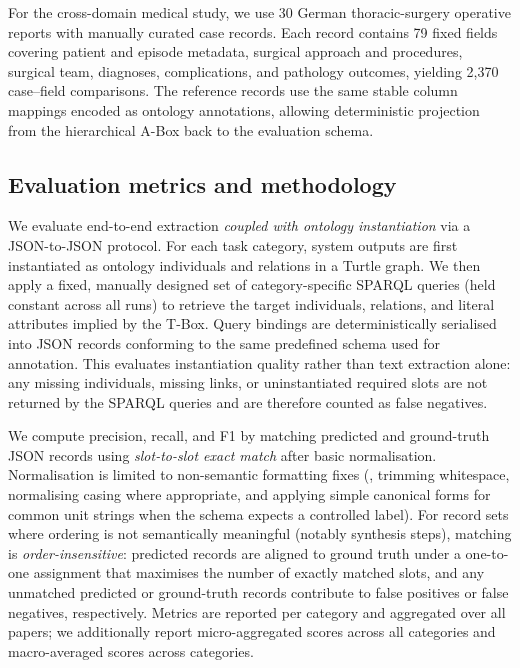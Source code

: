 For the cross-domain medical study, we use 30 German thoracic-surgery operative reports with manually curated case records. Each record contains 79 fixed fields covering patient and episode metadata, surgical approach and procedures, surgical team, diagnoses, complications, and pathology outcomes, yielding 2{,}370 case--field comparisons. The reference records use the same stable column mappings encoded as ontology annotations, allowing deterministic projection from the hierarchical A-Box back to the evaluation schema.

\subsection{Evaluation metrics and methodology}

We evaluate end-to-end extraction \emph{coupled with ontology instantiation} via a
JSON-to-JSON protocol. For each task category, system outputs are first
instantiated as ontology individuals and relations in a Turtle graph. We then
apply a fixed, manually designed set of category-specific SPARQL queries (held
constant across all runs) to retrieve the target individuals, relations, and
literal attributes implied by the T-Box. Query bindings are deterministically
serialised into JSON records conforming to the same predefined schema used for
annotation. This evaluates instantiation quality rather than text extraction
alone: any missing individuals, missing links, or uninstantiated required slots
are not returned by the SPARQL queries and are therefore counted as false
negatives.

We compute precision, recall, and F1 by matching predicted and ground-truth JSON
records using \emph{slot-to-slot exact match} after basic normalisation.
Normalisation is limited to non-semantic formatting fixes (\eg, trimming
whitespace, normalising casing where appropriate, and applying simple canonical
forms for common unit strings when the schema expects a controlled label). For
record sets where ordering is not semantically meaningful (notably synthesis
steps), matching is \emph{order-insensitive}: predicted records are aligned to
ground truth under a one-to-one assignment that maximises the number of exactly
matched slots, and any unmatched predicted or ground-truth records contribute to
false positives or false negatives, respectively. Metrics are reported per
category and aggregated over all papers; we additionally report micro-aggregated
scores across all categories and macro-averaged scores across categories.

